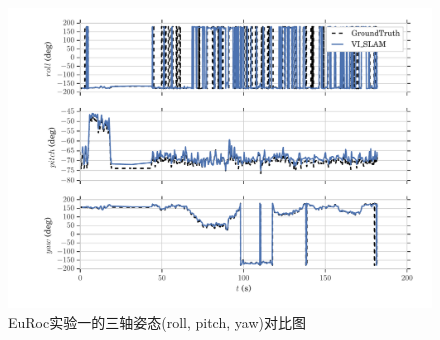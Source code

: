 \begin{figure}[!h]
	\centering
	\includegraphics[width=1.0\textwidth]{figures/chapter5/rpy_mh01}
	\caption{EuRoc实验一的三轴姿态(roll, pitch, yaw)对比图}\label{fig5_5}
\end{figure}

